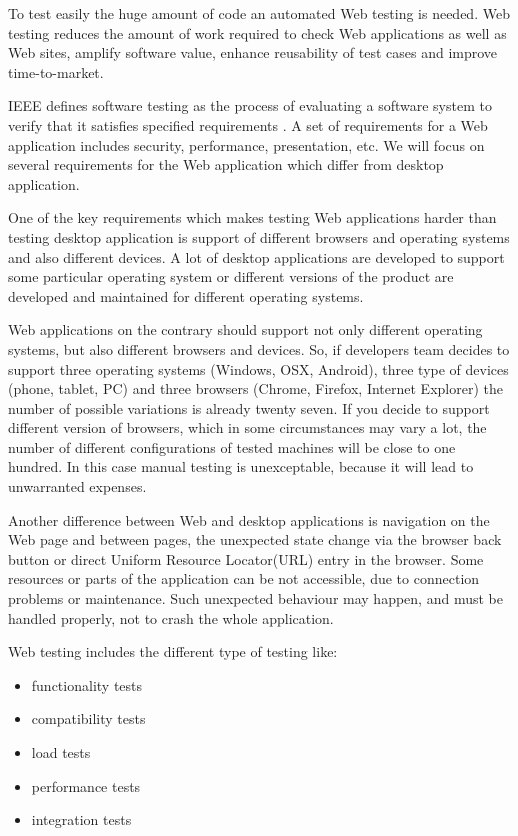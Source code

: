 	 	 To test easily the huge amount of code an automated Web testing is needed.	
	 	 Web testing reduces the amount of work required to check Web applications as
	 	 well as Web sites, amplify software value, enhance reusability of test cases and improve time-to-market.
	   
		IEEE defines software testing as the process of evaluating a software
		system to verify that it satisfies specified requirements \cite{Xu1}. A set of
		requirements for a Web application includes security, performance,
		presentation, etc. We will focus on several requirements for the Web
		application which differ from desktop application. 
		
		One of the key requirements which makes testing Web applications harder than
		testing desktop application is support of different browsers and operating systems and also
		different devices. A lot of desktop applications are developed to support some
		particular operating system or different versions of the product are developed
		and maintained for different operating systems. 
		
		Web applications on the
		contrary should support not only different operating systems, but also
		different browsers and devices. So, if developers team decides to support
		three operating systems (Windows, OSX, Android), three type of devices (phone,
		tablet, PC) and three browsers (Chrome, Firefox, Internet Explorer) the number
		of possible variations is already twenty seven. If you decide to support
		different version of browsers, which in some circumstances may vary a lot,
		the number of different configurations of tested machines will be close to
		one hundred. In this case manual testing is unexceptable, because it will lead
		to unwarranted expenses. 
		
		Another difference between Web and desktop applications is
		navigation on the Web page and between pages, the unexpected state change via
		the browser back button or direct Uniform Resource Locator(URL) entry in the
		browser. Some resources or parts of the application can be not
		accessible, due to connection problems or maintenance. Such unexpected
		behaviour may happen, and must be handled properly, not to crash the whole application.

		Web testing includes the different type of testing like:
		\begin{itemize}
		  \item functionality tests
		  \item compatibility tests
		  \item load tests
		  \item performance tests
		  \item integration tests
		\end{itemize}

